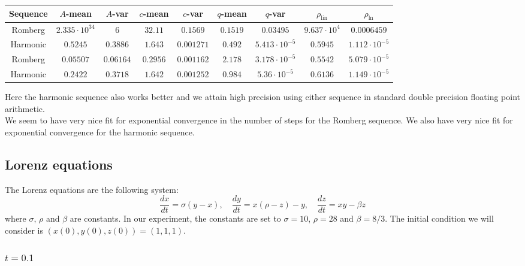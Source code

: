 \begin{table}[H]
    \centering
    \small
    \begin{tabular}{c||c|c|c|c|c|c|c|c}
Sequence & \(A\)-mean & \(A\)-var & \(c\)-mean & \(c\)-var & \(q\)-mean & \(q\)-var & \(\rho_{\operatorname{lin}}\) & \(\rho_{\ln}\)\\\hline
\rowcolor{red}
Romberg & \(2.335\cdot 10^{34}\) & \(6\) & \(32.11\) & \(0.1569\) & \(0.1519\) & \(0.03495\) & \(9.637\cdot 10^4\) & \(0.0006459\) \\
\rowcolor{green}
Harmonic & \(0.5245\) & \(0.3886\) & \(1.643\) & \(0.001271\) & \(0.492\) & \(5.413\cdot 10^{-5}\) & \(0.5945\) & \(1.112\cdot 10^{-5}\) \\
\rowcolor{green}
Romberg & \(0.05507\) & \(0.06164\) & \(0.2956\) & \(0.001162\) & \(2.178\) & \(3.178\cdot 10^{-5}\) & \(0.5542\) & \(5.079\cdot 10^{-5}\) \\
\rowcolor{green}
Harmonic & \(0.2422\) & \(0.3718\) & \(1.642\) & \(0.001252\) & \(0.984\) & \(5.36\cdot 10^{-5}\) & \(0.6136\) & \(1.149\cdot 10^{-5}\) \\
    \end{tabular}
    \label{tab:my_label}
\end{table}

Here the harmonic sequence also works better and we attain high precision using either sequence in standard double precision floating point arithmetic.\\

We seem to have very nice fit for exponential convergence in the number of steps for the Romberg sequence. We also have very nice fit for exponential convergence for the harmonic sequence.

\subsection{Lorenz equations}

The Lorenz equations are the following system: 
\[
\frac{dx}{dt} = \sigma (y-x),\quad \frac{dy}{dt} = x(\rho - z) - y,\quad \frac{dz}{dt} = xy - \beta z
\]
where \(\sigma,\,\rho\) and \(\beta\) are constants. In our experiment, the constants are set to \(\sigma = 10\), \(\rho = 28\) and \(\beta = 8/3\). The initial condition we will consider is \((x(0),y(0),z(0)) = (1,1,1)\).\\

\subsubsection{\(t = 0.1\)}

